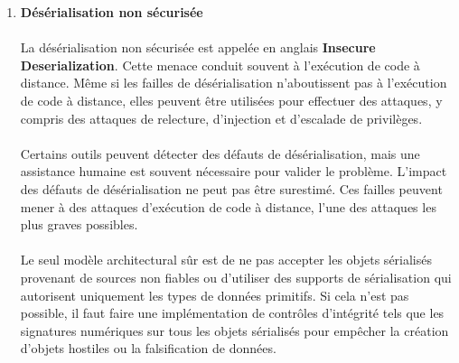 \begin{enumerate}[label=\roman*)]
		\paragraph{}
		La prévention de XSS nécessite la séparation des données non fiables du contenu du navigateur actif. Cela peut être réalisé en utilisant des frameworks qui échappent automatiquement à XSS par conception, comme le dernier Ruby on Rails, React JS. Apprenez les limites de la protection XSS de chaque framework et gérez correctement les cas d'utilisation qui ne sont pas couverts. L'échappement de données de requête HTTP non fiables en fonction du contexte de la sortie HTML (corps, attribut, JavaScript, CSS ou \gls{url}) résoudra les vulnérabilités XSS Reflected\footnote{la requ\^ete envoy\'ee vers le serveur contient le script malveillant qui est ensuite retourn\'e et ex\'ecut\'e par le navigateur} et Stored\footnote{injection du script conserv\'e en permanence par l'application cible}
		
		\vspace*{0.8cm} \item \textbf{Désérialisation non sécurisée} \vspace*{-0.4cm}
		\paragraph{}
		La désérialisation non sécurisée est appel\'ee en anglais \textbf{Insecure Deserialization}.
		Cette menace conduit souvent à l'exécution de code à distance. Même si les failles de désérialisation n'aboutissent pas à l'exécution de code à distance, elles peuvent être utilisées pour effectuer des attaques, y compris des attaques de relecture, d'injection et d'escalade de privilèges.
		\paragraph{}
		Certains outils peuvent détecter des défauts de désérialisation, mais une assistance humaine est souvent nécessaire pour valider le problème.
		L'impact des défauts de désérialisation ne peut pas être surestimé. Ces failles peuvent mener à des attaques d'exécution de code à distance, l'une des attaques les plus graves possibles.
		\paragraph{}
		Le seul modèle architectural sûr est de ne pas accepter les objets sérialisés provenant de sources non fiables ou d'utiliser des supports de sérialisation qui autorisent uniquement les types de données primitifs. Si cela n'est pas possible, il faut faire une implémentation de contrôles d'intégrité tels que les signatures numériques sur tous les objets sérialisés pour empêcher la création d'objets hostiles ou la falsification de données.


\end{enumerate}
